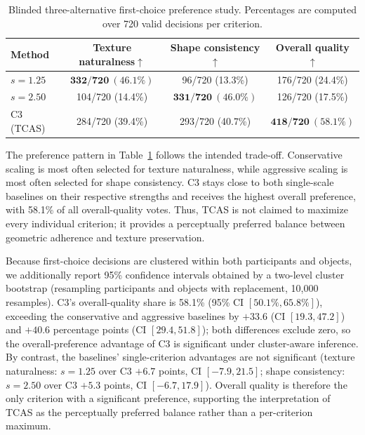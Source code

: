 \documentclass[times,twocolumn,final]{elsarticle}
\begin{document}
\begin{table}[!htbp]
\centering
\caption{Blinded three-alternative first-choice preference study. Percentages are computed over 720 valid decisions per criterion.}
\label{tab:preference}
\footnotesize\setlength{\tabcolsep}{3.5pt}
\begin{tabular}{lccc}
\toprule
Method & Texture naturalness$\uparrow$ & Shape consistency$\uparrow$ & Overall quality$\uparrow$ \\
\midrule
$s = 1.25$ & $\mathbf{332/720\ (46.1\%)}$ & 96/720 (13.3\%) & 176/720 (24.4\%) \\
$s = 2.50$ & 104/720 (14.4\%) & $\mathbf{331/720\ (46.0\%)}$ & 126/720 (17.5\%) \\
C3 (TCAS) & 284/720 (39.4\%) & 293/720 (40.7\%) & $\mathbf{418/720\ (58.1\%)}$ \\
\bottomrule
\end{tabular}
\end{table}
\FloatBarrier

The preference pattern in Table~\ref{tab:preference} follows the intended trade-off. Conservative scaling is most often selected for texture naturalness, while aggressive scaling is most often selected for shape consistency. C3 stays close to both single-scale baselines on their respective strengths and receives the highest overall preference, with 58.1\% of all overall-quality votes. Thus, TCAS is not claimed to maximize every individual criterion; it provides a perceptually preferred balance between geometric adherence and texture preservation.

Because first-choice decisions are clustered within both participants and objects, we additionally report 95\% confidence intervals obtained by a two-level cluster bootstrap (resampling participants and objects with replacement, 10{,}000 resamples). C3's overall-quality share is 58.1\% (95\% CI $[50.1\%, 65.8\%]$), exceeding the conservative and aggressive baselines by $+33.6$ (CI $[19.3, 47.2]$) and $+40.6$ percentage points (CI $[29.4, 51.8]$); both differences exclude zero, so the overall-preference advantage of C3 is significant under cluster-aware inference. By contrast, the baselines' single-criterion advantages are not significant (texture naturalness: $s = 1.25$ over C3 $+6.7$ points, CI $[-7.9, 21.5]$; shape consistency: $s = 2.50$ over C3 $+5.3$ points, CI $[-6.7, 17.9]$). Overall quality is therefore the only criterion with a significant preference, supporting the interpretation of TCAS as the perceptually preferred balance rather than a per-criterion maximum.
\end{document}
